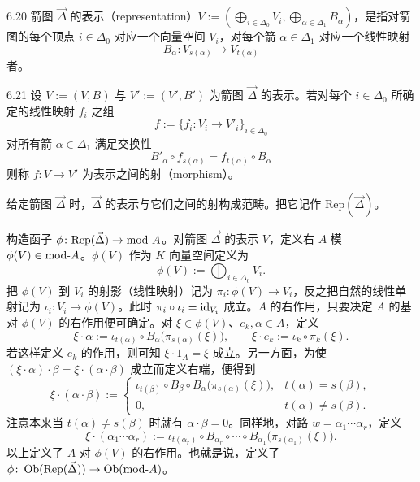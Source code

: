 
\begin{definition}{6.20}
箭图 $\vec{\Delta}$ 的表示（representation）$V:=(\bigoplus_{i\in\Delta_0}V_i,\bigoplus_{\alpha\in\Delta_1}B_\alpha)$，是指对箭图的每个顶点 $i\in\Delta_0$ 对应一个向量空间 $V_i$，对每个箭 $\alpha\in\Delta_1$ 对应一个线性映射
\[
B_\alpha\colon V_{s(\alpha)}\to V_{t(\alpha)}
\]
者。
\end{definition}

\begin{definition}{6.21}
设 $V:=(V,B)$ 与 $V':=(V',B')$ 为箭图 $\vec{\Delta}$ 的表示。若对每个 $i\in\Delta_0$ 所确定的线性映射 $f_i$ 之组
\[
f:=\{f_i\colon V_i\to V'_i\}_{i\in\Delta_0}
\]
对所有箭 $\alpha\in\Delta_1$ 满足交换性
\begin{equation}
B'_\alpha\circ f_{s(\alpha)}=f_{t(\alpha)}\circ B_\alpha \tag{6.1}
\end{equation}
则称 $f\colon V\to V'$ 为表示之间的射（morphism）。
\end{definition}

给定箭图 $\vec{\Delta}$ 时，$\vec{\Delta}$ 的表示与它们之间的射构成范畴。把它记作 $\mathrm{Rep}(\vec{\Delta})$。

构造函子 $\phi\colon\mathrm{Rep}(\vec{\Delta})\to\mathrm{mod}\text{-}A$。对箭图 $\vec{\Delta}$ 的表示 $V$，定义右 $A$ 模 $\phi(V)\in\mathrm{mod}\text{-}A$。$\phi(V)$ 作为 $K$ 向量空间定义为
\[
\phi(V):=\bigoplus_{i\in\Delta_0}V_i.
\]
把 $\phi(V)$ 到 $V_i$ 的射影（线性映射）记为 $\pi_i\colon\phi(V)\to V_i$，反之把自然的线性单射记为 $\iota_i\colon V_i\to\phi(V)$。此时 $\pi_i\circ\iota_i=\mathrm{id}_{V_i}$ 成立。$A$ 的右作用，只要决定 $A$ 的基对 $\phi(V)$ 的右作用便可确定。对 $\xi\in\phi(V)$、$e_k,\alpha\in A$，定义
\[
\xi\cdot\alpha:=\iota_{t(\alpha)}\circ B_\alpha\bigl(\pi_{s(\alpha)}(\xi)\bigr),\qquad
\xi\cdot e_k:=\iota_k\circ\pi_k(\xi).
\]
若这样定义 $e_k$ 的作用，则可知 $\xi\cdot 1_A=\xi$ 成立。另一方面，为使 $(\xi\cdot\alpha)\cdot\beta=\xi\cdot(\alpha\cdot\beta)$ 成立而定义右端，便得到
\[
\xi\cdot(\alpha\cdot\beta):=
\begin{cases}
\iota_{t(\beta)}\circ B_\beta\circ B_\alpha\bigl(\pi_{s(\alpha)}(\xi)\bigr), & t(\alpha)=s(\beta),\\[2pt]
0, & t(\alpha)\neq s(\beta).
\end{cases}
\]
注意本来当 $t(\alpha)\neq s(\beta)$ 时就有 $\alpha\cdot\beta=0$。同样地，对路 $w=\alpha_1\cdots\alpha_r$，定义
\[
\xi\cdot(\alpha_1\cdots\alpha_r):=\iota_{t(\alpha_r)}\circ B_{\alpha_r}\circ\cdots\circ B_{\alpha_1}\bigl(\pi_{s(\alpha_1)}(\xi)\bigr).
\]
以上定义了 $A$ 对 $\phi(V)$ 的右作用。也就是说，定义了 $\phi\colon\operatorname{Ob}(\mathrm{Rep}(\vec{\Delta}))\to\operatorname{Ob}(\mathrm{mod}\text{-}A)$。

